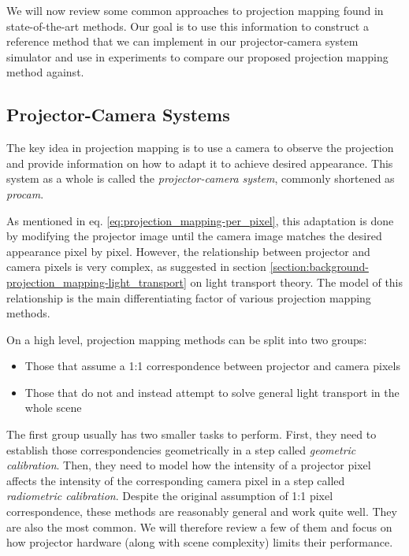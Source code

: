 We will now review some common approaches to projection mapping found in state-of-the-art methods. Our goal is to use this information to construct a reference method that we can implement in our projector-camera system simulator and use in experiments to compare our proposed projection mapping method against.

\subsection{Projector-Camera Systems}
\label{section:background-projection_mapping-procams}

The key idea in projection mapping is to use a camera to observe the projection and provide information on how to adapt it to achieve desired appearance. This system as a whole is called the \textit{projector-camera system}, commonly shortened as \textit{procam}.

As mentioned in eq. \ref{eq:projection_mapping-per_pixel}, this adaptation is done by modifying the projector image until the camera image matches the desired appearance pixel by pixel. However, the relationship between projector and camera pixels is very complex, as suggested in section \ref{section:background-projection_mapping-light_transport} on light transport theory. The model of this relationship is the main differentiating factor of various projection mapping methods.

On a high level, projection mapping methods can be split into two groups:

\begin{itemize}
    \item Those that assume a 1:1 correspondence between projector and camera pixels
    \item Those that do not and instead attempt to solve general light transport in the whole scene
\end{itemize}

The first group usually has two smaller tasks to perform. First, they need to establish those correspondencies geometrically in a step called \textit{geometric calibration}. Then, they need to model how the intensity of a projector pixel affects the intensity of the corresponding camera pixel in a step called \textit{radiometric calibration}. Despite the original assumption of 1:1 pixel correspondence, these methods are reasonably general and work quite well. They are also the most common. We will therefore review a few of them and focus on how projector hardware (along with scene complexity) limits their performance.

